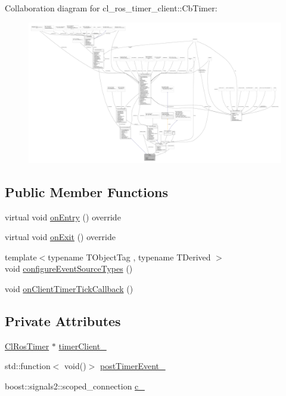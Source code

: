 Collaboration diagram for cl\+\_\+ros\+\_\+timer\+\_\+client\+:\+:Cb\+Timer\+:
\nopagebreak
\begin{figure}[H]
\begin{center}
\leavevmode
\includegraphics[width=350pt]{classcl__ros__timer__client_1_1CbTimer__coll__graph}
\end{center}
\end{figure}
\subsection*{Public Member Functions}
\begin{DoxyCompactItemize}
\item 
virtual void \hyperlink{classcl__ros__timer__client_1_1CbTimer_a3cc833546cc7ef8761d58463edf410e0}{on\+Entry} () override
\item 
virtual void \hyperlink{classcl__ros__timer__client_1_1CbTimer_a07ea741b1aad4e7f944f7895a024999f}{on\+Exit} () override
\item 
{\footnotesize template$<$typename T\+Object\+Tag , typename T\+Derived $>$ }\\void \hyperlink{classcl__ros__timer__client_1_1CbTimer_a46f605303de1def2d4fe38463b84548c}{configure\+Event\+Source\+Types} ()
\item 
void \hyperlink{classcl__ros__timer__client_1_1CbTimer_a1561084a02ca147091d9e6a7b29256c8}{on\+Client\+Timer\+Tick\+Callback} ()
\end{DoxyCompactItemize}
\subsection*{Private Attributes}
\begin{DoxyCompactItemize}
\item 
\hyperlink{classcl__ros__timer__client_1_1ClRosTimer}{Cl\+Ros\+Timer} $\ast$ \hyperlink{classcl__ros__timer__client_1_1CbTimer_af23359781ad6f7dae40cf0c9c1b3e48e}{timer\+Client\+\_\+}
\item 
std\+::function$<$ void()$>$ \hyperlink{classcl__ros__timer__client_1_1CbTimer_abf76f24311c8ad19f0abc4b76457f45b}{post\+Timer\+Event\+\_\+}
\item 
boost\+::signals2\+::scoped\+\_\+connection \hyperlink{classcl__ros__timer__client_1_1CbTimer_a4ef395aabbe63dad1341e544320c79ce}{c\+\_\+}
\end{DoxyCompactItemize}


